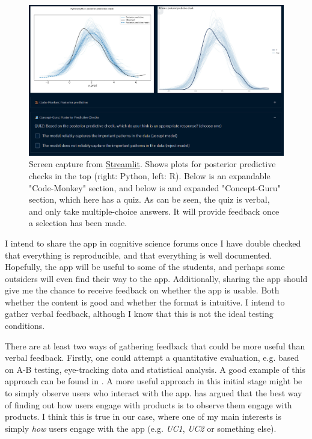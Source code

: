 \documentclass[12pt]{article}
\begin{document}
\begin{figure}[H]
    \centerline{\includegraphics[scale = 0.5]{../img/Quiz-image.png}}
    \caption{Screen capture from
    \href{https://share.streamlit.io/victor-m-p/bayesworkflow/main/BayesWorkflow.py}{Streamlit}.
    Shows plots for posterior predictive checks in the top (right: Python,
    left: R). Below is an expandable "Code-Monkey" section, and below is
    and expanded "Concept-Guru" section, which here has a quiz.
    As can be seen, the quiz is verbal, and only take multiple-choice answers.
    It will provide feedback once a selection has been made.
    }
\end{figure}



\vspace{5mm}

I intend to share the app in cognitive science forums once I have double checked
that everything is reproducible, and that everything is well documented. Hopefully,
the app will be useful to some of the students, and perhaps some outsiders will even
find their way to the app. Additionally, sharing the app should give me the chance
to receive feedback on whether the app is usable. Both whether the content is good
and whether the format is intuitive. I intend to gather verbal feedback,
although I know that this is not the ideal testing conditions.

\vspace{5mm}

There are at least two ways of gathering feedback that could be more useful
than verbal feedback. Firstly, one could attempt a quantitative evaluation,
e.g. based on A-B testing, eye-tracking data and statistical analysis.
A good example of this approach can be found in \textcite{sutcliffe2016}.
A more useful approach in this initial stage might be to simply observe users who interact
with the app. \textcite{norman1999} has argued that the best way of finding
out how users engage with products is to observe them engage with products.
I think this is true in our case, where one of my main interests is simply
\emph{how} users engage with the app (e.g. \emph{UC1}, \emph{UC2} or something
else).
\end{document}

